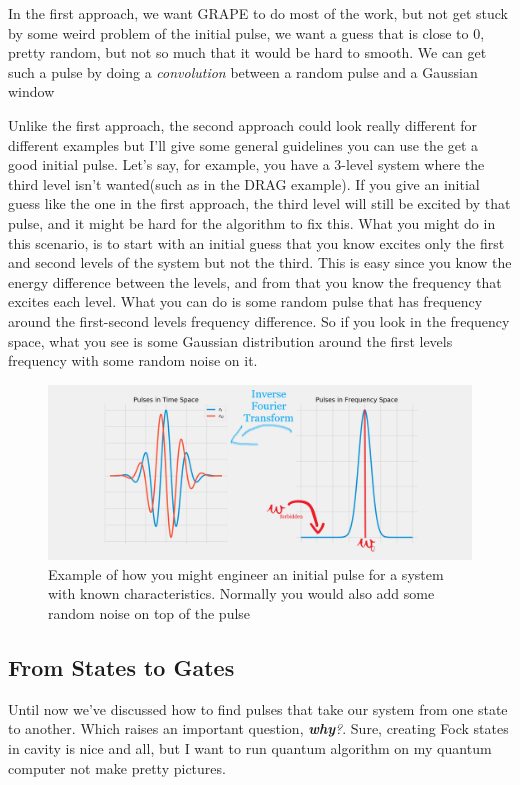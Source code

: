 \documentclass[english, a4paper, 12pt, twoside]{article}
\numberwithin{equation}{section} %
\begin{document}
In the first approach, we want GRAPE to do most of the work, but not get stuck by some weird problem of the initial pulse, we want a guess that is close to 0, pretty random, but not so much that it would be hard to smooth. We can get such a pulse by doing a \textit{convolution} between a random pulse and a Gaussian window %

Unlike the first approach, the second approach could look really different for different examples but I'll give some general guidelines you can use the get a good initial pulse. Let's say, for example, you have a 3-level system where the third level isn't wanted(such as in the DRAG example). If you give an initial guess like the one in the first approach, the third level will still be excited by that pulse, and it might be hard for the algorithm to fix this. What you might do in this scenario, is to start with an initial guess that you know excites only the first and second levels of the system but not the third. This is easy since you  know the energy difference between the levels, and from that you know the frequency that excites each level. What you can do is some random pulse that has frequency around the first-second levels frequency difference. So if you look in the frequency space, what you see is some Gaussian distribution around the first levels frequency with some random noise on it.

\begin{figure}[H]
    \centering
    \includegraphics[width=1\columnwidth]{exaple-of-engineered-guess-edited.png}
    \caption{Example of how you might engineer an initial pulse for a system with known characteristics. Normally you would also add some random noise on top of the pulse}
    \label{fig:example-engineered-initial-guess}
\end{figure}
\subsection{From States to Gates}\label{sec:gate-GRAPE}
Until now we've discussed how to find pulses that take our system from one state to another. Which raises an important question, \textit{\textbf{why}?}. Sure, creating Fock states in cavity is nice and all, but I want to run quantum algorithm on my quantum computer not make pretty pictures.
\end{document}
